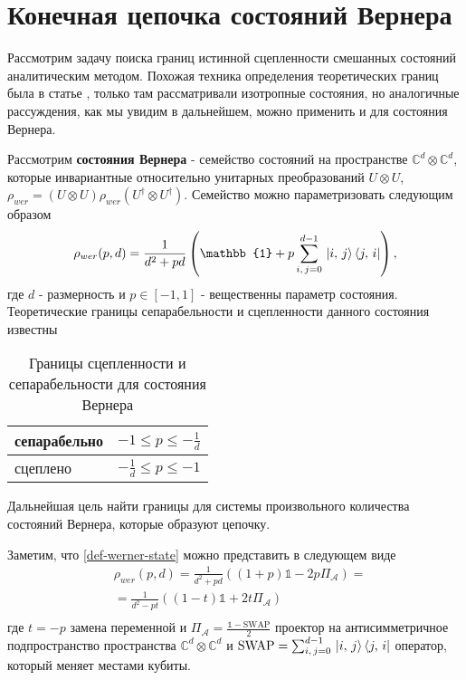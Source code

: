 \section{Конечная цепочка состояний Вернера}
Рассмотрим задачу поиска границ истинной сцепленности смешанных состояний аналитическим методом.
Похожая техника определения теоретических границ была в статье \cite{Contreras_Tejada_2022}, только там рассматривали изотропные состояния, но аналогичные рассуждения, как мы увидим в дальнейшем, можно применить и для состояния Вернера.

Рассмотрим \textbf{состояния Вернера} \cite{PhysRevA.40.4277} - семейство состояний на пространстве $\mathbb{C}^d\otimes\mathbb{C}^d$, которые инвариантные относительно унитарных преобразований $U \otimes U$, $\rho_{wer} = (U \otimes U)\rho_{wer} (U^{\dag} \otimes U^{\dag})$. Семейство можно параметризовать следующим образом
\begin{equation}\label{def-werner-state}
    \rho_{wer}(p,d) = \frac1{d^2 + pd}\left(\mathbb{1} + p\sum_{i,\,j=0}^{d-1}\,\ket{i,\,j}\bra{j,\,i}\right),
\end{equation}
где $d$ - размерность и $p \in [-1, 1]$ - вещественны параметр состояния.
Теоретические границы сепарабельности и сцепленности данного состояния известны
\begin{table}[ht]
\centering
\begin{tabular}{ l | c }
  сепарабельно & $ -1 \leq p \leq -\frac{1}{d}$ \\
  \hline
  сцеплено & $ -\frac{1}{d} \leq p \leq -1$ \\
\end{tabular}
\caption{Границы сцепленности и сепарабельности для состояния Вернера}
\label{table:theor-bound-werner}
\end{table}
Дальнейшая цель найти границы для системы произвольного количества состояний Вернера, которые образуют цепочку. 

Заметим, что \ref{def-werner-state} можно представить в следующем виде
\begin{equation}
\begin{split}
& \rho_{wer}(p, d) = 
    \frac{1}{d^2 + pd}
    \left(
    (1 + p) \mathbb{1} - 2p \Pi_{\mathcal A} 
    \right) = \\
& = \frac{1}{d^2 - pt}
    \left(
    (1 - t) \mathbb{1} + 2t \Pi_{\mathcal A} 
    \right)  \\
\end{split}
\end{equation}
где $t = -p$ замена переменной и $\Pi_{\mathcal A} = \frac{\mathbb{1}-\mathrm{SWAP}}2$ проектор на антисимметричное подпространство пространства $\mathbb{C}^d\otimes\mathbb{C}^d$ и $\mathrm{SWAP} = \sum_{i,\,j=0}^{d-1}\,\ket{i,\,j}\bra{j,\,i}$ оператор, который меняет местами кубиты.

